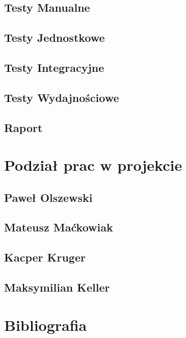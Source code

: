 \documentclass{article}
\begin{document}
\subsection{Testy Manualne}
\subsection{Testy Jednostkowe}
\subsection{Testy Integracyjne}
\subsection{Testy Wydajnościowe}
\subsection{Raport}
\section{Podział prac w projekcie}
\subsection{Paweł Olszewski}
\subsection{Mateusz Maćkowiak}
\subsection{Kacper Kruger}
\subsection{Maksymilian Keller}
\section{Bibliografia}
\end{document}
